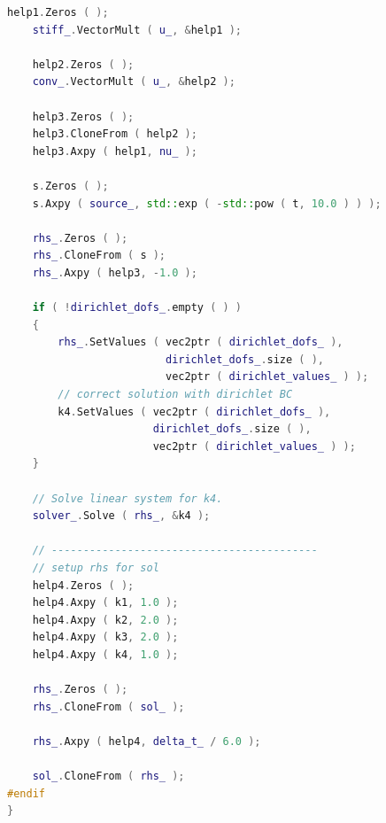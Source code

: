 \documentclass[a4paper, 11pt, twoside]{article}
\begin{document}
\begin{lstlisting}[language=C++, basicstyle={\footnotesize, \ttfamily}, keywordstyle=\color{blue}, numbers=none, tabsize=4]
    help1.Zeros ( );
    stiff_.VectorMult ( u_, &help1 );

    help2.Zeros ( );
    conv_.VectorMult ( u_, &help2 );

    help3.Zeros ( );
    help3.CloneFrom ( help2 );
    help3.Axpy ( help1, nu_ );

    s.Zeros ( );
    s.Axpy ( source_, std::exp ( -std::pow ( t, 10.0 ) ) );

    rhs_.Zeros ( );
    rhs_.CloneFrom ( s );
    rhs_.Axpy ( help3, -1.0 );

    if ( !dirichlet_dofs_.empty ( ) )
    {
        rhs_.SetValues ( vec2ptr ( dirichlet_dofs_ ), 
                         dirichlet_dofs_.size ( ), 
                         vec2ptr ( dirichlet_values_ ) );
        // correct solution with dirichlet BC
        k4.SetValues ( vec2ptr ( dirichlet_dofs_ ), 
                       dirichlet_dofs_.size ( ), 
                       vec2ptr ( dirichlet_values_ ) );
    }

    // Solve linear system for k4.
    solver_.Solve ( rhs_, &k4 );

    // ------------------------------------------
    // setup rhs for sol
    help4.Zeros ( );
    help4.Axpy ( k1, 1.0 );
    help4.Axpy ( k2, 2.0 );
    help4.Axpy ( k3, 2.0 );
    help4.Axpy ( k4, 1.0 );

    rhs_.Zeros ( );
    rhs_.CloneFrom ( sol_ );

    rhs_.Axpy ( help4, delta_t_ / 6.0 );

    sol_.CloneFrom ( rhs_ );
#endif
}
\end{lstlisting}
\end{document}
